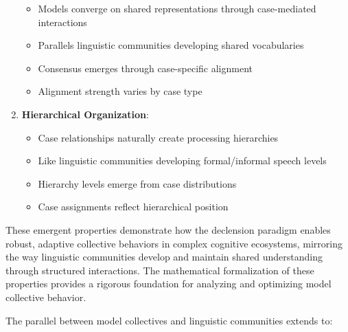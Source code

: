 \begin{enumerate}
  \begin{itemize}
  \tightlist
  \item
    Models converge on shared representations through case-mediated
    interactions
  \item
    Parallels linguistic communities developing shared vocabularies
  \item
    Consensus emerges through case-specific alignment
  \item
    Alignment strength varies by case type
  \end{itemize}
\item
  \textbf{Hierarchical Organization}:

  \begin{itemize}
  \tightlist
  \item
    Case relationships naturally create processing hierarchies
  \item
    Like linguistic communities developing formal/informal speech levels
  \item
    Hierarchy levels emerge from case distributions
  \item
    Case assignments reflect hierarchical position
  \end{itemize}
\end{enumerate}

These emergent properties demonstrate how the declension paradigm
enables robust, adaptive collective behaviors in complex cognitive
ecosystems, mirroring the way linguistic communities develop and
maintain shared understanding through structured interactions. The
mathematical formalization of these properties provides a rigorous
foundation for analyzing and optimizing model collective behavior.

The parallel between model collectives and linguistic communities
extends to:

